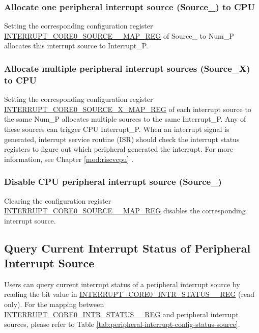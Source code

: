 \documentclass[main\_\_EN.tex]{subfiles}
\begin{document}
\subsubsection{Allocate one peripheral interrupt source (Source\_) to CPU}
Setting the corresponding configuration register \hyperref[regdesc:INTERRUPTCORE0PIFPMSMONITORVIOLATESIZEINTRMAPREG]{INTERRUPT\_CORE0\_SOURCE\_\_MAP\_REG} of Source\_ to Num\_P allocates this interrupt source to Interrupt\_P. 

\subsubsection{Allocate multiple peripheral interrupt sources (Source\_X) to CPU}
Setting the corresponding configuration register \hyperref[regdesc:INTERRUPTCORE0PIFPMSMONITORVIOLATESIZEINTRMAPREG]{INTERRUPT\_CORE0\_SOURCE\_X\_MAP\_REG} of each interrupt source to the same Num\_P allocates multiple sources to the same Interrupt\_P. Any of these sources can trigger CPU Interrupt\_P. When an interrupt signal is generated, interrupt service routine (ISR) should check the interrupt status registers to figure out which peripheral generated the interrupt. For more information, see Chapter \ref{mod:riscvcpu} \textit{}.

\subsubsection{Disable CPU peripheral interrupt source (Source\_)}
Clearing the configuration register \hyperref[regdesc:INTERRUPTCORE0PIFPMSMONITORVIOLATESIZEINTRMAPREG]{INTERRUPT\_CORE0\_SOURCE\_\_MAP\_REG} disables the corresponding interrupt source.

\subsection{Query Current Interrupt Status of Peripheral Interrupt Source}

Users can query current interrupt status of a peripheral interrupt source by reading the bit value in \hyperref[regdesc:INTERRUPTCORE0INTRSTATUS0REG]{INTERRUPT\_CORE0\_INTR\_STATUS\_\_REG} (read only). For the mapping between \hyperref[regdesc:INTERRUPTCORE0INTRSTATUS0REG]{INTERRUPT\_CORE0\_INTR\_STATUS\_\_REG} and peripheral interrupt sources, please refer to Table \ref{tab:peripheral-interrupt-config-status-source}.
\end{document}
